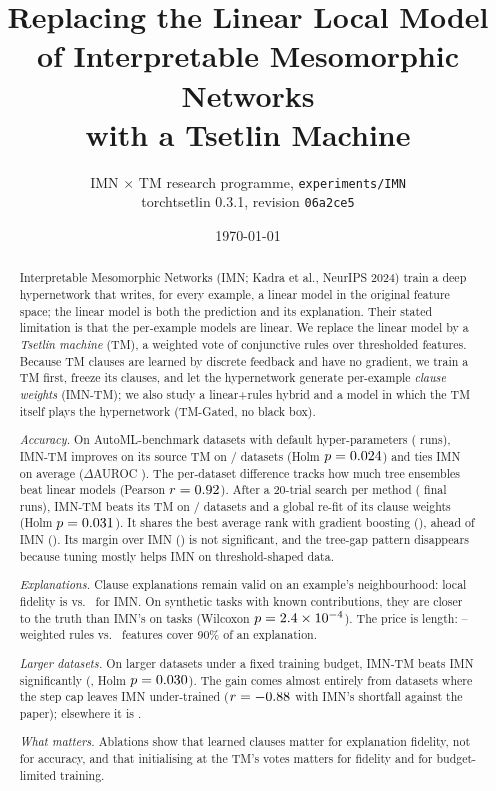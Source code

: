 \documentclass[10pt,a4paper]{article}
\title{Replacing the Linear Local Model of Interpretable Mesomorphic Networks\\with a Tsetlin Machine}
\author{IMN $\times$ TM research programme, \texttt{experiments/IMN} \\
  \small torchtsetlin 0.3.1, revision \texttt{06a2ce5}}
\date{\today}
\newcommand{\imn}{\textsc{IMN}}
\newcommand{\arm}[1]{\textsf{#1}}
\begin{document}
\maketitle

\begin{abstract}
Interpretable Mesomorphic Networks (\imn{}; Kadra et al., NeurIPS 2024) train a deep hypernetwork that
writes, for every example, a linear model in the original feature space; the linear model is both the
prediction and its explanation. Their stated limitation is that the per-example models are linear. We
replace the linear model by a \emph{Tsetlin machine} (TM), a weighted vote of conjunctive rules over
thresholded features. Because TM clauses are learned by discrete feedback and have no gradient, we train a
TM first, freeze its clauses, and let the hypernetwork generate per-example \emph{clause weights}
(\arm{IMN-TM}); we also study a linear+rules hybrid and a model in which the TM itself plays the
hypernetwork (\arm{TM-Gated}, no black box).

\emph{Accuracy.} On \MainDatasets{} AutoML-benchmark datasets with default hyper-parameters
(\MainRecords{} runs), \arm{IMN-TM} improves on its source TM on
\MainimntmtmWins/\MainDatasets{} datasets (Holm $p=0.024$) and ties \imn{} on average
($\Delta$AUROC \MainimntmimnMean). The per-dataset difference tracks how much tree ensembles beat
linear models (Pearson $r=0.92$). After a 20-trial search per method (\HpoRecords{}
final runs), \arm{IMN-TM} beats its TM on \HpoimntmtmWins/\HpoDatasets{} datasets and a global
re-fit of its clause weights (Holm $p=0.031$). It shares the best average rank
with gradient boosting (\HpoRankimntm), ahead of \imn{} (\HpoRankimn). Its margin over \imn{}
(\HpoimntmimnMean) is not significant, and the tree-gap pattern disappears because tuning
mostly helps \imn{} on threshold-shaped data.

\emph{Explanations.} Clause explanations remain valid on an example's neighbourhood: local
fidelity is \HpoFidimntm{} vs.\ \HpoFidimn{} for \imn{}. On \XaiVsimnN{} synthetic tasks with
known contributions, they are closer to the truth than \imn{}'s on \XaiVsimnWins{} tasks
(Wilcoxon $p=2.4\times 10^{-4}$). The price is length: \MainClausesimntm--\HpoClausesimntm{} weighted
rules vs.\ \MainLinimn{} features cover 90\% of an explanation.

\emph{Larger datasets.} On \TiertwoDatasets{} larger datasets under a fixed training budget,
\arm{IMN-TM} beats \imn{} significantly (\TiertwoimntmimnMean, Holm $p=0.030$).
The gain comes almost entirely from datasets where the step cap leaves \imn{} under-trained
($r=-0.88$ with \imn{}'s shortfall against the paper); elsewhere it is
\TiertwoRestMean.

\emph{What matters.} Ablations show that learned clauses matter for explanation fidelity, not
for accuracy, and that initialising at the TM's votes matters for fidelity and for
budget-limited training.
\end{abstract}
\end{document}
